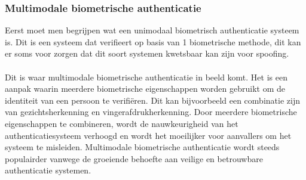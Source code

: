   \subsubsection{Multimodale biometrische authenticatie}%
  \label{subsubsec:multimodale-biometrische-authenticatie}
  Eerst moet men begrijpen wat een unimodaal biometrisch authenticatie systeem is. Dit is een systeem dat verifieert op basis van 1 biometrische methode, dit kan er soms voor zorgen dat dit soort systemen kwetsbaar kan zijn voor spoofing.
  \\
  \\
  Dit is waar multimodale biometrische authenticatie in beeld komt. Het is een aanpak waarin meerdere biometrische eigenschappen worden gebruikt om de identiteit van een persoon te verifiëren. Dit kan bijvoorbeeld een combinatie zijn van gezichtsherkenning en vingerafdrukherkenning. Door meerdere biometrische eigenschappen te combineren, wordt de nauwkeurigheid van het authenticatiesysteem verhoogd en wordt het moeilijker voor aanvallers om het systeem te misleiden. Multimodale biometrische authenticatie wordt steeds populairder vanwege de groeiende behoefte aan veilige en betrouwbare authenticatie systemen.
  
